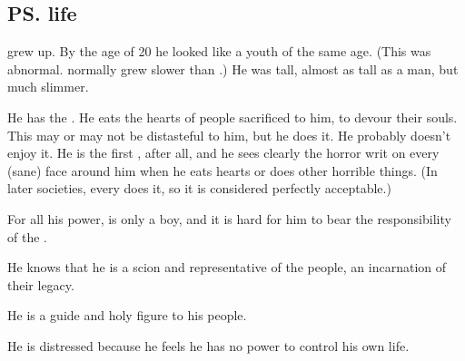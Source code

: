 \subsection{\ps{\Thanatzil}{} life}
\Thanatzil{} grew up. 
By the age of 20 he looked like a \human{} youth of the same age. 
(This was abnormal. \Resphain{} normally grew slower than \humans.) 
He was tall, almost as tall as a \nephilic{} man, but much slimmer. 

He has the . 
He eats the hearts of people sacrificed to him, to devour their souls. 
This may or may not be distasteful to him, but he does it. 
He probably doesn't enjoy it. He is the first \resphan, after all, and he sees clearly the horror writ on every (sane) face around him when he eats hearts or does other horrible things. 
(In later \resphan{} societies, every \resphan{} does it, so it is considered perfectly acceptable.)

For all his power, \Thanatzil{} is only a boy, and it is hard for him to bear the responsibility of the \banemessiah. 

He knows that he is a scion and representative of the \bane{} people, an incarnation of their legacy.


He is a guide and holy figure to his people. 


He is distressed because he feels he has no power to control his own life. 

